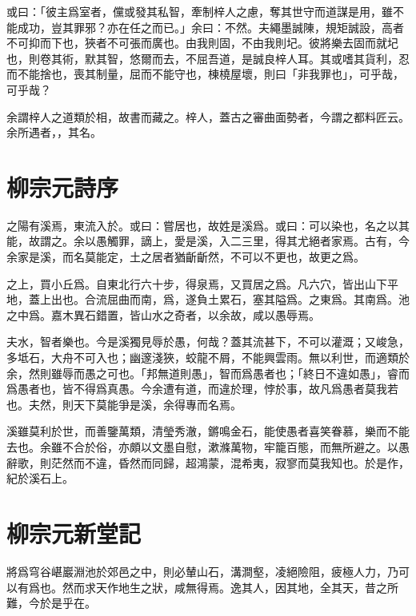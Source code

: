 或曰：「彼主爲室者，儻或發其私智，牽制梓人之慮，奪其世守而道謀是用，雖不能成功，豈其罪邪？亦在任之而已。」余曰：不然。夫繩墨誠陳，規矩誠設，高者不可抑而下也，狹者不可張而廣也。由我則固，不由我則圮。彼將樂去固而就圮也，則卷其術，默其智，悠爾而去，不屈吾道，是誠良梓人耳。其或嗜其貨利，忍而不能捨也，喪其制量，屈而不能守也，棟橈屋壞，則曰「非我罪也」，可乎哉，可乎哉？

余謂梓人之道類於相，故書而藏之。梓人，蓋古之審曲面勢者，今謂之都料匠云。余所遇者，，其名。

\section[愚溪詩序\quad{\small 柳宗元}]{{\normalsize 柳宗元}\quad {}詩序}
之陽有溪焉，東流入於。或曰：嘗居也，故姓是溪爲。或曰：可以染也，名之以其能，故謂之。余以愚觸罪，謫上，愛是溪，入二三里，得其尤絕者家焉。古有，今余家是溪，而名莫能定，土之居者猶齗齗然，不可以不更也，故更之爲。

之上，買小丘爲。自東北行六十步，得泉焉，又買居之爲。凡六穴，皆出山下平地，蓋上出也。合流屈曲而南，爲，遂負土累石，塞其隘爲。之東爲。其南爲。池之中爲。嘉木異石錯置，皆山水之奇者，以余故，咸以愚辱焉。

夫水，智者樂也。今是溪獨見辱於愚，何哉？蓋其流甚下，不可以灌溉；又峻急，多坻石，大舟不可入也；幽邃淺狹，蛟龍不屑，不能興雲雨。無以利世，而適類於余，然則雖辱而愚之可也。「邦無道則愚」，智而爲愚者也；「終日不違如愚」，睿而爲愚者也，皆不得爲真愚。今余遭有道，而違於理，悖於事，故凡爲愚者莫我若也。夫然，則天下莫能爭是溪，余得專而名焉。

溪雖莫利於世，而善鑒萬類，清瑩秀澈，鏘鳴金石，能使愚者喜笑眷慕，樂而不能去也。余雖不合於俗，亦頗以文墨自慰，漱滌萬物，牢籠百態，而無所避之。以愚辭歌，則茫然而不違，昏然而同歸，超鴻蒙，混希夷，寂寥而莫我知也。於是作，紀於溪石上。

\section[永州韋使君新堂記\quad{\small 柳宗元}]{{\normalsize 柳宗元}\quad {}新堂記}
將爲穹谷嵁巖淵池於郊邑之中，則必輦山石，溝澗壑，{凌}絕險阻，疲極人力，乃可以有爲也。然而求天作地生之狀，咸無得焉。逸其人，因其地，全其天，昔之所難，今於是乎在。


